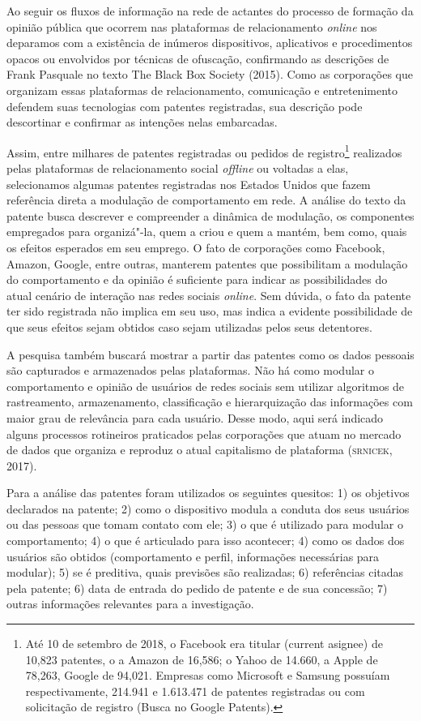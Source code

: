 Ao seguir os fluxos de informação na rede de actantes do processo de
formação da opinião pública que ocorrem nas plataformas de
relacionamento \emph{\emph{online}} nos deparamos com a existência de inúmeros
dispositivos, aplicativos e procedimentos opacos ou envolvidos por
técnicas de ofuscação, confirmando as descrições de Frank Pasquale no
texto The Black Box Society (2015). Como as corporações que organizam
essas plataformas de relacionamento, comunicação e entretenimento
defendem suas tecnologias com patentes registradas, sua descrição pode
descortinar e confirmar as intenções nelas embarcadas.

Assim, entre milhares de patentes registradas ou pedidos de
registro\footnote{Até 10 de setembro de 2018, o Facebook era titular
  (current asignee) de 10,823 patentes, o a Amazon de 16,586; o Yahoo de
  14.660, a Apple de 78,263, Google de 94,021. Empresas como Microsoft e
  Samsung possuíam respectivamente, 214.941 e 1.613.471 de patentes
  registradas ou com solicitação de registro (Busca no Google Patents).}
realizados pelas plataformas de relacionamento social \emph{offline} ou
voltadas a elas, selecionamos algumas patentes registradas nos Estados
Unidos que fazem referência direta a modulação de comportamento em rede.
A análise do texto da patente busca descrever e compreender a dinâmica
de modulação, os componentes empregados para organizá"-la, quem a criou e
quem a mantém, bem como, quais os efeitos esperados em seu emprego. O
fato de corporações como Facebook, Amazon, Google, entre outras,
manterem patentes que possibilitam a modulação do comportamento e da
opinião é suficiente para indicar as possibilidades do atual cenário de
interação nas redes sociais \emph{\emph{online}}. Sem dúvida, o fato da patente ter
sido registrada não implica em seu uso, mas indica a evidente
possibilidade de que seus efeitos sejam obtidos caso sejam utilizadas
pelos seus detentores.

A pesquisa também buscará mostrar a partir das patentes como os dados
pessoais são capturados e armazenados pelas plataformas. Não há como
modular o comportamento e opinião de usuários de redes sociais sem
utilizar algoritmos de rastreamento, armazenamento, classificação e
hierarquização das informações com maior grau de relevância para cada
usuário. Desse modo, aqui será indicado alguns processos rotineiros
praticados pelas corporações que atuam no mercado de dados que organiza
e reproduz o atual capitalismo de plataforma (\textsc{srnicek}, 2017).

Para a análise das patentes foram utilizados os seguintes quesitos: 1)
os objetivos declarados na patente; 2) como o dispositivo modula a
conduta dos seus usuários ou das pessoas que tomam contato com ele; 3) o
que é utilizado para modular o comportamento; 4) o que é articulado para
isso acontecer; 4) como os dados dos usuários são obtidos (comportamento
e perfil, informações necessárias para modular); 5) se é preditiva,
quais previsões são realizadas; 6) referências citadas pela patente; 6)
data de entrada do pedido de patente e de sua concessão; 7) outras
informações relevantes para a investigação.

